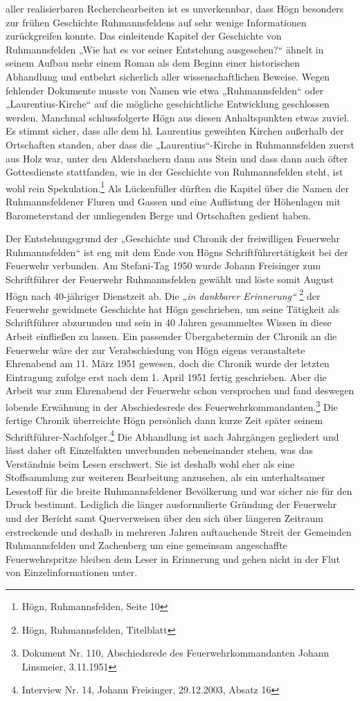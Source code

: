 \documentclass[a4paper]{article}
\newcommand\textstyleZitate[1]{\textit{#1}}
\begin{document}
aller realisierbaren Recherchearbeiten ist es unverkennbar, dass Högn
besonders zur frühen Geschichte Ruhmannsfeldens auf sehr wenige
Informationen zurückgreifen konnte. Das einleitende Kapitel der
Geschichte von Ruhmannsfelden „Wie hat es vor seiner Entstehung
ausgesehen?“ ähnelt in seinem Aufbau mehr einem Roman als dem Beginn
einer historischen Abhandlung und entbehrt sicherlich aller
wissenschaftlichen Beweise. Wegen fehlender Dokumente musste von Namen
wie etwa „Ruhmannsfelden“ oder „Laurentius-Kirche“ auf die mögliche
geschichtliche Entwicklung geschlossen werden. Manchmal schlussfolgerte
Högn aus diesen Anhaltspunkten etwas zuviel. Es stimmt sicher, dass
alle dem hl. Laurentius geweihten Kirchen außerhalb der Ortschaften
standen, aber dass die „Laurentius“-Kirche in Ruhmannsfelden zuerst aus
Holz war, unter den Aldersbachern dann aus Stein und dass dann auch
öfter Gottesdienste stattfanden, wie in der Geschichte von
Ruhmannsfelden steht, ist wohl rein Spekulation.\footnote{ Högn,
Ruhmannsfelden, Seite 10} Als Lückenfüller dürften die Kapitel über die
Namen der Ruhmannsfeldener Fluren und Gassen und eine Auflistung der
Höhenlagen mit Barometerstand der umliegenden Berge und Ortschaften
gedient haben.

Der Entstehungsgrund der „Geschichte und Chronik der freiwilligen
Feuerwehr Ruhmannsfelden“ ist eng mit dem Ende von Högns
Schriftführertätigkeit bei der Feuerwehr verbunden. Am Stefani-Tag 1950
wurde Johann Freisinger zum Schriftführer der Feuerwehr Ruhmannsfelden
gewählt und löste somit August Högn nach 40-jähriger Dienstzeit ab. Die
\textstyleZitate{„in dankbarer Erinnerung“} \footnote{ Högn,
Ruhmannsfelden, Titelblatt} der Feuerwehr gewidmete Geschichte hat Högn
geschrieben, um seine Tätigkeit als Schriftführer abzurunden und sein
in 40 Jahren gesammeltes Wissen in diese Arbeit einfließen zu lassen.
Ein passender Übergabetermin der Chronik an die Feuerwehr wäre der zur
Verabschiedung von Högn eigens veranstaltete Ehrenabend am 11. März
1951 gewesen, doch die Chronik wurde der letzten Eintragung zufolge
erst nach dem 1. April 1951 fertig geschrieben. Aber die Arbeit war zum
Ehrenabend der Feuerwehr schon versprochen und fand deswegen lobende
Erwähnung in der Abschiedesrede des Feuerwehrkommandanten.\footnote{
Dokument Nr. 110, Abschiedsrede des Feuerwehrkommandanten Johann
Linsmeier, 3.11.1951} Die fertige Chronik überreichte Högn persönlich
dann kurze Zeit später seinem Schriftführer-Nachfolger.\footnote{
Interview Nr. 14, Johann Freisinger, 29.12.2003, Absatz 16} Die
Abhandlung ist nach Jahrgängen gegliedert und lässt daher oft
Einzelfakten unverbunden nebeneinander stehen, was das Verständnis beim
Lesen erschwert. Sie ist deshalb wohl eher als eine Stoffsammlung zur
weiteren Bearbeitung anzusehen, als ein unterhaltsamer Lesestoff für
die breite Ruhmannsfeldener Bevölkerung und war sicher nie für den
Druck bestimmt. Lediglich die länger ausformulierte Gründung der
Feuerwehr und der Bericht samt Querverweisen über den sich über
längeren Zeitraum erstreckende und deshalb in mehreren Jahren
auftauchende Streit der Gemeinden Ruhmannsfelden und Zachenberg um eine
gemeinsam angeschaffte Feuerwehrspritze bleiben dem Leser in Erinnerung
und gehen nicht in der Flut von Einzelinformationen unter.
\end{document}
